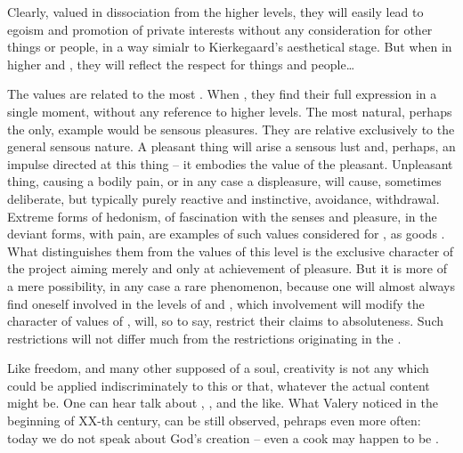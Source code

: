 \subpa
Clearly, valued in dissociation from the higher levels, they will 
easily lead to egoism and promotion of  private interests 
without any consideration for other things or people, in a way 
simialr to Kierkegaard's aesthetical stage. 
But when  
in higher  and , they will reflect the respect 
for things and people\ldots

\pa \imm The  values are related to the most .  When , they find their full expression in
a single moment, without any reference to higher levels.  The most
natural, perhaps the only, example would be sensous pleasures.  They
are relative exclusively to the general sensous nature.  A pleasant
thing will arise a sensous lust and, perhaps, an impulse directed at
this thing -- it embodies the value of the pleasant.  Unpleasant
thing, causing a bodily pain, or in any case a displeasure, will
cause, sometimes deliberate, but typically purely reactive and
instinctive, avoidance, withdrawal.  Extreme forms of hedonism, of
fascination with the senses and pleasure, in the deviant forms, with
pain, are examples of such values considered for ,
as goods .  What distinguishes them from the
 values of this level is the exclusive
character of the project aiming merely and only at achievement of
pleasure.  But it is more of a mere possibility, in any case a rare
phenomenon, because one will almost always find oneself involved in the
levels of  and , which involvement will
modify the character of values of , will, so to say,
restrict their claims to absoluteness.  Such restrictions will not
differ much from the restrictions originating in the .





     
\pa Like freedom, and many other supposed  of a soul,
creativity is not any  which could be applied
indiscriminately to this or that, whatever the actual content might
be.  One can hear talk about , , and the like.  What Valery noticed in the beginning of
XX-th century, can be still observed, pehraps even more often: today 
we do not speak about God's creation -- 
even a cook may happen to be .

